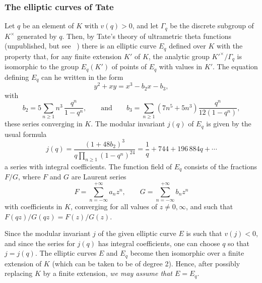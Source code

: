 \begin{subappendices}
\subsubsection{The elliptic curves of Tate}
\label{sec:IV_A11}
Let $q$ be an element of $K$ with $v(q) > 0$, and let $\Gamma_q$ be the
discrete subgroup of $K^\times$ generated by $q$. Then, by Tate's theory of
ultrametric theta functions (unpublished, but see
\citeauthor{morikawa:theta}~\cite{morikawa:theta})
\dpage
there is an elliptic curve $E_q$ defined over $K$
with the property that, for any finite extension $K'$ of $K$, the analytic
group ${K'}^\times / \Gamma_q$ is isomorphic to the group $E_q(K')$ of points
of $E_q$ with values in $K'$. The equation defining $E_q$ can he written in the
form
\[
	y^2 + xy = x^3 - b_2x - b_3,
\]
with
\[
	b_2 = 5 \sum_{n\ge 1} n^3 \, \frac{q^n}{1-q^n}, \qquad \text{and}
	\qquad b_3 = \sum_{n\ge 1} (7n^5 + 5n^3) \frac{q^n}{12(1-q^n)},
\]
these series converging in $K$. The modular invariant $j(q)$ of $E_q$ is
given by the usual formula
\[
	j(q) = \frac{(1 + 48b_2)^3}{q \prod_{n\ge 1} (1 - q^n)^{24}}
	= \frac{1}{q} + 744 + 196\,884 q + \cdots
\]
a series with integral coefficients. The function field of $E_q$ consists
of the fractions $F/G$, where $F$ and $G$ are Laurent series
\[
	F = \sum_{n=-\infty}^{+\infty} a_n z^n, \qquad
	G = \sum_{n=-\infty}^{+\infty} b_n z^n
\]
with coefficients in $K$, converging for all values of $z \ne 0, \infty$, and
such that $F(qz)/G(qz) = F(z)/G(z)$.

Since the modular invariant $j$ of the given elliptic curve $E$
is such that $v(j) < 0$, and since the series for $j(q)$ has integral
coefficients, one can choose $q$ so that $j = j(q)$. The elliptic curves
$E$ and $E_q$ become then isomorphic over a finite extension of $K$
(which can be taken to be of degree 2). Hence, after possibly 
replacing $K$ by a finite extension, \emph{we may assume that $E = E_q$}.


\end{subappendices}

